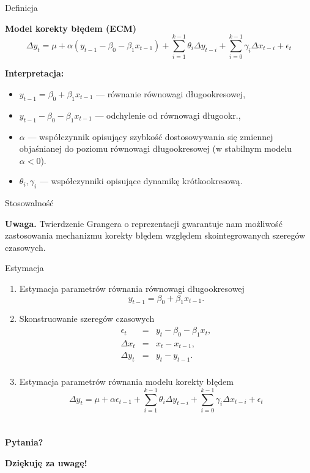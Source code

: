 \documentclass[a4paper, 11pt]{beamer}
\begin{document}
	\begin{frame}{Definicja}
		\begin{block}{\textbf{Model korekty błędem (ECM)}}
			\[
				\Delta y_{t} =
					\mu +
					\alpha \left(y_{t-1} - \beta_{0} - \beta_{1} x_{t-1}\right) + 
					\sum_{i=1}^{k-1} \theta_{i} \Delta y_{t-i} + 
					\sum_{i=0}^{k-1} \gamma_{i} \Delta x_{t-i} + 
					\epsilon_{t}
			\]
		\end{block}
		\textbf{Interpretacja:}
		\begin{itemize}
			\item $y_{t-1} = \beta_{0} + \beta_{1} x_{t-1}$ --- równanie równowagi
				długookresowej,
			\item $y_{t-1} - \beta_{0} - \beta_{1} x_{t-1}$ --- odchylenie od 
				równowagi długookr.,
			\item $\alpha$ --- współczynnik opisujący szybkość dostosowywania się 
				zmiennej objaśnianej do poziomu równowagi długookresowej (w 
				stabilnym modelu $\alpha < 0$).
			\item $\theta_{i}, \gamma_{i}$ --- współczynniki opisujące dynamikę
				krótkookresową.
		\end{itemize}
	\end{frame}
	
	\begin{frame}{Stosowalność}
		\begin{alert}{\textbf{Uwaga.}}
			Twierdzenie Grangera o reprezentacji gwarantuje nam możliwość
			zastosowania mechanizmu korekty błędem względem skointegrowanych
			szeregów czasowych.
		\end{alert}
	\end{frame}
	
	\begin{frame}{Estymacja}
		\begin{enumerate}
			\item Estymacja parametrów równania równowagi długookresowej \[
				y_{t-1} = \beta_{0} + \beta_{1} x_{t-1}.
			\]
			\item Skonstruowanie szeregów czasowych \begin{eqnarray*}
				\epsilon_{t} & = & y_{t} - \beta_{0} - \beta_{1} x_{t},\\
				\Delta x_{t} & = & x_{t} - x_{t-1},\\
				\Delta y_{t} & = & y_{t} - y_{t-1}.\\
			\end{eqnarray*}
			\item Estymacja parametrów równania modelu korekty błędem \[
				\Delta y_{t} =
					\mu +
					\alpha \epsilon_{t-1} + 
					\sum_{i=1}^{k-1} \theta_{i} \Delta y_{t-i} + 
					\sum_{i=0}^{k-1} \gamma_{i} \Delta x_{t-i} + 
					\epsilon_{t}
			\]
		\end{enumerate}
	\end{frame}

	\section*{}

	\begin{frame}
		\center
		\Huge \bfseries
		Pytania?
	\end{frame}

	\begin{frame}
		\center
		\Huge \bfseries
		Dziękuję za uwagę!
	\end{frame}
\end{document}
